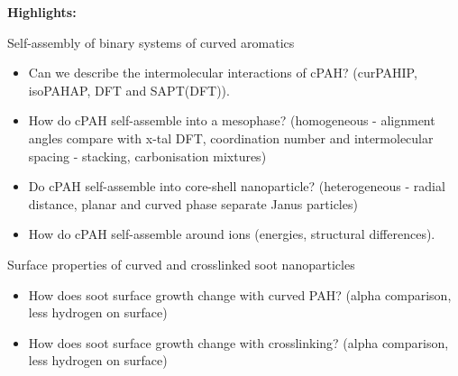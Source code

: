 \documentclass[como,a4paper,12pt,final]{Classes/c4e-preprint}
\begin{document}
\textbf{Highlights:}

Self-assembly of binary systems of curved aromatics
\begin{itemize}
\item Can we describe the intermolecular interactions of cPAH? (curPAHIP, isoPAHAP, DFT and SAPT(DFT)).
\item How do cPAH self-assemble into a mesophase? (homogeneous - alignment angles compare with x-tal DFT, coordination number and intermolecular spacing - stacking, carbonisation mixtures)
\item Do cPAH self-assemble into core-shell nanoparticle? (heterogeneous - radial distance, planar and curved phase separate Janus particles)
\item How do cPAH self-assemble around ions (energies, structural differences).
\end{itemize}

Surface properties of curved and crosslinked soot nanoparticles
\begin{itemize}
\item How does soot surface growth change with curved PAH? (alpha comparison, less hydrogen on surface)
\item How does soot surface growth change with crosslinking? (alpha comparison, less hydrogen on surface)
\end{itemize}

\vfill

\clearpage \setcounter{tocdepth}{3} \tableofcontents

\clearpage


\clearpage \appendix
{}


\clearpage \citeindexfalse

\end{document}
